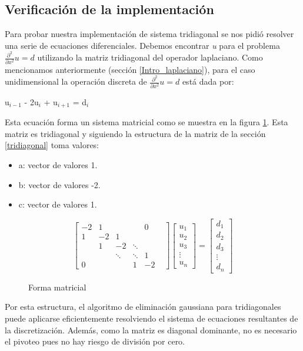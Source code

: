 \subsection{Verificación de la implementación}
Para probar nuestra implementación de sistema tridiagonal se nos pidió resolver una serie de ecuaciones diferenciales. Debemos encontrar \textit{u} para el problema $\frac{\partial^2}{\partial x^2}u = d$ utilizando la matriz tridiagonal del operador laplaciano.
Como mencionamos anteriormente (sección \ref{Intro_laplaciano}), para el caso unidimensional la operación discreta de $\frac{\partial^2}{\partial x^2}u = d$ está dada por:

u$_{i-1}$ - 2u$_{i}$ + u$_{i+1}$ = d$_{i}$

Esta ecuación forma un sistema matricial como se muestra en la figura \ref{laplaciano}. Esta matriz es tridiagonal y siguiendo la estructura de la matriz de la sección \ref{tridiagonal} toma valores:

\begin{itemize}
    \item a: vector de valores 1.
    \item b: vector de valores -2.
    \item c: vector de valores 1.
\end{itemize}

\begin{figure}[H]
    \[ \begin{bmatrix}
-2 & 1 & & & 0\\
1 & -2 & 1 & & & \\
    & 1 & -2 & \ddots & \\
    &    & \ddots &  \ddots & 1\\
0   &    &   & 1 & -2
     \end{bmatrix}
     \begin{bmatrix}
           u_{1}\\
           u_{2} \\
           u_{3}\\ 
           \vdots\\ 
           u_{n}  
     \end{bmatrix}
      =
     \begin{bmatrix}
          d_{1} \\
          d_{2}\\
          d_{3}\\
         \vdots\\ 
         d_{n}  
     \end{bmatrix} \]
     \caption{Forma matricial}\label{laplaciano}
\end{figure}
Por esta estructura,  el algoritmo de eliminación gaussiana para tridiagonales puede aplicarse eficientemente resolviendo el sistema de ecuaciones resultantes de la discretización. Además, como la matriz es diagonal dominante, no es necesario el pivoteo pues no hay riesgo de división por cero. 

